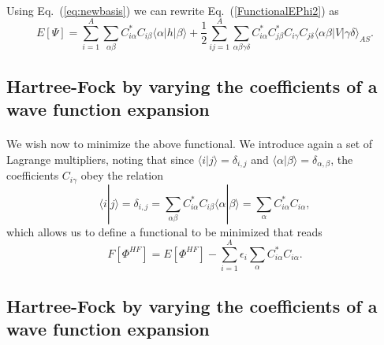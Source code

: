 \documentclass[%
twoside,                 %
final,                   %
10pt]{article}
\begin{document}
\paragraph{}
Using Eq.~(\ref{eq:newbasis}) we can rewrite Eq.~(\ref{FunctionalEPhi2}) as 
\begin{equation}
  E[\Psi] 
  = \sum_{i=1}^A \sum_{\alpha\beta} C^*_{i\alpha}C_{i\beta}\langle \alpha | h | \beta \rangle +
  \frac{1}{2}\sum_{ij=1}^A\sum_{{\alpha\beta\gamma\delta}} C^*_{i\alpha}C^*_{j\beta}C_{i\gamma}C_{j\delta}\langle \alpha\beta|V|\gamma\delta\rangle_{AS}. \label{FunctionalEPhi3}
\end{equation}



\subsection*{Hartree-Fock by varying the coefficients of a wave function expansion}

\paragraph{}
We wish now to minimize the above functional. We introduce again a set of Lagrange multipliers, noting that
since $\langle i | j \rangle = \delta_{i,j}$ and $\langle \alpha | \beta \rangle = \delta_{\alpha,\beta}$, 
the coefficients $C_{i\gamma}$ obey the relation
\[
 \langle i | j \rangle=\delta_{i,j}=\sum_{\alpha\beta} C^*_{i\alpha}C_{i\beta}\langle \alpha | \beta \rangle=
\sum_{\alpha} C^*_{i\alpha}C_{i\alpha},
\]
which allows us to define a functional to be minimized that reads
\begin{equation}
  F[\Phi^{HF}]=E[\Phi^{HF}] - \sum_{i=1}^A\epsilon_i\sum_{\alpha} C^*_{i\alpha}C_{i\alpha}.
\end{equation}





\subsection*{Hartree-Fock by varying the coefficients of a wave function expansion}

\end{document}
